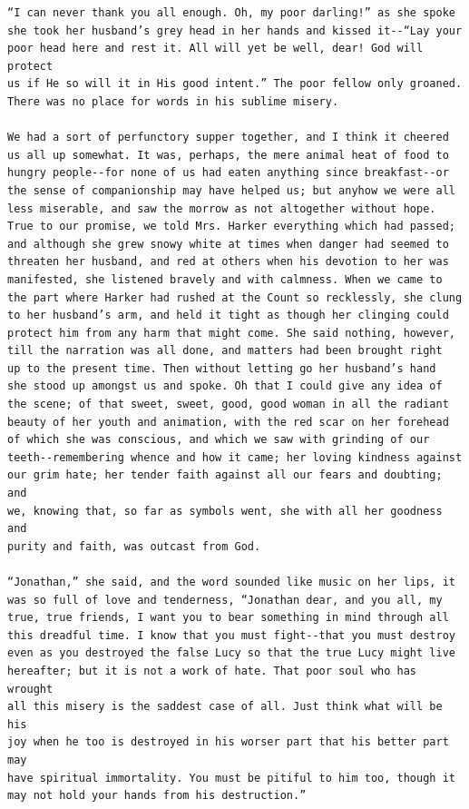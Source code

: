 \documentclass{article}
\begin{document}
\begin{verbatim}
“I can never thank you all enough. Oh, my poor darling!” as she spoke
she took her husband’s grey head in her hands and kissed it--“Lay your
poor head here and rest it. All will yet be well, dear! God will protect
us if He so will it in His good intent.” The poor fellow only groaned.
There was no place for words in his sublime misery.

We had a sort of perfunctory supper together, and I think it cheered
us all up somewhat. It was, perhaps, the mere animal heat of food to
hungry people--for none of us had eaten anything since breakfast--or
the sense of companionship may have helped us; but anyhow we were all
less miserable, and saw the morrow as not altogether without hope.
True to our promise, we told Mrs. Harker everything which had passed;
and although she grew snowy white at times when danger had seemed to
threaten her husband, and red at others when his devotion to her was
manifested, she listened bravely and with calmness. When we came to
the part where Harker had rushed at the Count so recklessly, she clung
to her husband’s arm, and held it tight as though her clinging could
protect him from any harm that might come. She said nothing, however,
till the narration was all done, and matters had been brought right
up to the present time. Then without letting go her husband’s hand
she stood up amongst us and spoke. Oh that I could give any idea of
the scene; of that sweet, sweet, good, good woman in all the radiant
beauty of her youth and animation, with the red scar on her forehead
of which she was conscious, and which we saw with grinding of our
teeth--remembering whence and how it came; her loving kindness against
our grim hate; her tender faith against all our fears and doubting; and
we, knowing that, so far as symbols went, she with all her goodness and
purity and faith, was outcast from God.

“Jonathan,” she said, and the word sounded like music on her lips, it
was so full of love and tenderness, “Jonathan dear, and you all, my
true, true friends, I want you to bear something in mind through all
this dreadful time. I know that you must fight--that you must destroy
even as you destroyed the false Lucy so that the true Lucy might live
hereafter; but it is not a work of hate. That poor soul who has wrought
all this misery is the saddest case of all. Just think what will be his
joy when he too is destroyed in his worser part that his better part may
have spiritual immortality. You must be pitiful to him too, though it
may not hold your hands from his destruction.”


\end{verbatim}
\end{document}
